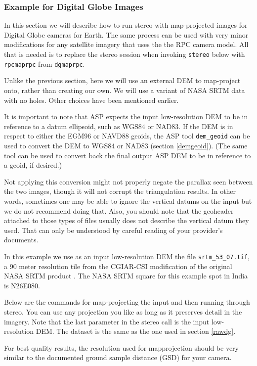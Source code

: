 \subsubsection{Example for Digital Globe Images}
\label{dg-mapproj}

In this section we will describe how to run stereo with map-projected
images for Digital Globe cameras for Earth. The same process can be used
with very minor modifications for any satellite imagery that uses the
the RPC camera model. All that is needed is to replace the stereo
session when invoking \texttt{stereo} below with \texttt{rpcmaprpc} from
\texttt{dgmaprpc}.

Unlike the previous section, here we will use an external DEM to map-project
onto, rather than creating our own. We will use a variant of NASA
SRTM data with no holes. Other choices have been mentioned earlier.

It is important to note that ASP expects the input low-resolution DEM to
be in reference to a datum ellipsoid, such as WGS84 or NAD83. If the DEM
is in respect to either the EGM96 or NAVD88 geoids, the ASP tool
\texttt{dem\_geoid} can be used to convert the DEM to WGS84 or NAD83
(section \ref{demgeoid}). (The same tool can be used to convert back the
final output ASP DEM to be in reference to a geoid, if desired.)

Not applying this conversion might not properly negate the parallax
seen between the two images, though it will not corrupt the
triangulation results. In other words, sometimes one may be able to
ignore the vertical datums on the input but we do not recommend
doing that. Also, you should note that the geoheader attached to those
types of files usually does not describe the vertical datum they
used. That can only be understood by careful reading of your
provider's documents.

In this example we use as an input low-resolution DEM the file
\texttt{srtm\_53\_07.tif}, a 90 meter resolution tile from the CGIAR-CSI
modification of the original NASA SRTM product \cite{cgiar:srtm90m}.
The NASA SRTM square for this example spot in India is N26E080.

Below are the commands for map-projecting the input and then running
through stereo. You can use any projection you like as long as it
preserves detail in the imagery. Note that the last parameter in the
stereo call is the input low-resolution DEM. The dataset is the same
as the one used in section \ref{rawdg}.

For best quality results, the resolution used for mapprojection
should be very similar to the documented ground sample distance (GSD)
for your camera. 

